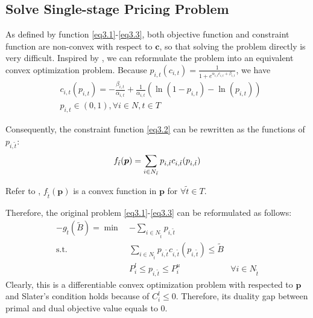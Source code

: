 \documentclass[sigconf,authordraft]{acmart}
\begin{document}
\subsection{Solve Single-stage Pricing Problem}\label{sec:offline-single}
As defined by function \eqref{eq3.1}-\eqref{eq3.3}, both objective function and constraint function are non-convex with respect to $\boldsymbol{c}$, so that solving the problem directly is very difficult. Inspired by \cite{zhao2019unified,dong2009dynamic,li2011pricing}, we can reformulate the problem into an equivalent convex optimization problem. Because $p_{i,t}(c_{i,t})=\frac{1}{1+e^{\alpha_{i,t} c_{i,t}+\beta_{i,t}}}$, we have
\begin{equation}\label{eq4.1}
\begin{split}
     & c_{i,t}(p_{i,t})=-\frac{\beta_{i,t}}{\alpha_{i,t}}+\frac{1}{\alpha_{i,t}}(\ln(1-p_{i,t})-\ln(p_{i,t}))\\
     & p_{i,t}\in(0,1), \forall i\in N,t\in T
\end{split}
\end{equation}

Consequently, the constraint function \eqref{eq3.2} can be rewritten as the functions of $p_{i,\tilde{t}}$:
\begin{equation}
    f_{\tilde{t}}(\boldsymbol{p})=\sum_{i\in N_{\tilde{t}}}p_{i,\tilde{t}}c_{i,\tilde{t}}(p_{i,\tilde{t}})\\
\end{equation}

Refer to \cite{zhao2019unified,dong2009dynamic,li2011pricing}, $f_{\tilde{t}}(\boldsymbol{p})$ is a convex function in $\boldsymbol{p}$ for $\forall \tilde{t}\in T$. 

Therefore, the original problem \eqref{eq3.1}-\eqref{eq3.3} can be reformulated as follows:
\begin{align}
    \label{eq5.1}-g_{\tilde{t}}(\tilde{B})= \min~& -\sum_{i\in N_{\tilde{t}}}p_{i,\tilde{t}} \\
    \label{eq5.2}\mbox{s.t. }& \sum_{i\in N_{\tilde{t}}}p_{i,\tilde{t}}c_{i,\tilde{t}}(p_{i,\tilde{t}})\le \tilde{B}\\
    \label{eq5.3}& P_i^l\le p_{i,\tilde{t}}\le P_i^u & \forall i \in N_{\tilde{t}}
\end{align}
Clearly, this is a differentiable convex optimization problem with respected to $\boldsymbol{p}$ and Slater's condition holds because of $C_i^l\le 0$. Therefore, its duality gap between primal and dual objective value equals to 0\cite{boyd2004convex}.
\end{document}
